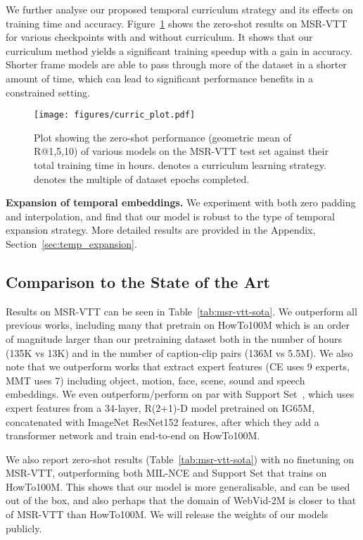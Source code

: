  We further analyse our proposed temporal curriculum strategy and its effects on training time and accuracy. Figure~\ref{fig:curric} shows the zero-shot results on MSR-VTT for various checkpoints with and without curriculum. It shows that our curriculum method yields a significant training speedup with a gain in accuracy. Shorter frame models are able to pass through more of the dataset in a shorter amount of time, which can lead to significant performance benefits in a constrained setting.


\begin{figure}
    \centering
    \texttt{[image: figures/curric\_plot.pdf]}
    \caption{Plot showing the zero-shot performance (geometric mean of R@{1,5,10}) of various models on the MSR-VTT test set against their total training time in hours.  denotes a curriculum learning strategy.  denotes the multiple of dataset epochs completed.}
    \label{fig:curric}
\end{figure}



\noindent\textbf{Expansion of temporal embeddings.}
We experiment with both zero padding and interpolation, and find that our model is robust to the type of temporal expansion strategy. More detailed results are provided in the Appendix, Section~\ref{sec:temp_expansion}.


\subsection{Comparison to the State of the Art}
\label{subsec:sota}
Results on MSR-VTT can be seen in Table~\ref{tab:msr-vtt-sota}.
We outperform all previous works, including many that pretrain on HowTo100M which is an order of magnitude larger than our pretraining dataset both in the number of hours (135K vs 13K) and in the number of caption-clip pairs (136M vs 5.5M). We also note that we outperform works that extract expert features (CE uses 9 experts, MMT uses 7) including object, motion, face, scene, sound and speech embeddings. We even outperform/perform on par with Support Set~\cite{patrick2020support}, which uses expert features from a 34-layer, R(2+1)-D model pretrained on IG65M, concatenated with ImageNet ResNet152 features, after which they add a transformer network and train end-to-end on HowTo100M. 

We also report zero-shot results (Table~\ref{tab:msr-vtt-sota}) with no finetuning on MSR-VTT, outperforming both MIL-NCE and Support Set that trains on HowTo100M. This shows that our model is more generalisable, and can be used out of the box, and also perhaps that the domain of WebVid-2M is closer to that of MSR-VTT than HowTo100M. We will release the weights of our models publicly.

